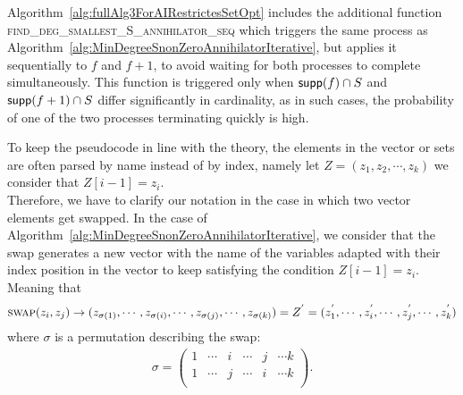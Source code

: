 \documentclass[11pt]{llncs}
\begin{document}
Algorithm~\ref{alg:fullAlg3ForAIRestrictesSetOpt} includes the additional function \textsc{find\_deg\_smallest\_S\_annihilator\_seq} which triggers the same process as Algorithm~\ref{alg:MinDegreeSnonZeroAnnihilatorIterative}, but applies it sequentially to $f$ and $f + 1$, to avoid waiting for both processes to complete simultaneously. This function is triggered only when $\mathsf{supp}(f) \cap S$ and $\mathsf{supp}(f + 1) \cap S$ differ significantly in cardinality, as in such cases, the probability of one of the two processes terminating quickly is high.

\begin{remark}\label{rem:permutationClarification}
    To keep the pseudocode in line with the theory, the elements in the vector or sets are often parsed by name instead of by index, namely let $Z = (z_1, z_2, \cdots, z_k)$ we consider that $Z[i-1] = z_i$.\\
    Therefore, we have to clarify our notation in the case in which two vector elements get swapped. In the case of Algorithm~\ref{alg:MinDegreeSnonZeroAnnihilatorIterative}, we consider that the swap generates a new vector with the name of the variables adapted with their index position in the vector to keep satisfying the condition $Z[i-1] = z_{i}$. Meaning that 
    \begin{align*}
        \mbox{\textsc{swap}}(z_i, z_j) \rightarrow (z_{\sigma(1)}, \cdots, z_{\sigma(i)}, \cdots, z_{\sigma(j)}, \cdots, z_{\sigma(k)}) = Z^{'} = (z^{'}_1, \cdots, z^{'}_i, \cdots, z^{'}_j, \cdots, z^{'}_k)
    \end{align*}
    where $\sigma$ is a permutation describing the swap:
    \begin{align*}
        \sigma = \begin{pmatrix}
            1 & \cdots & i & \cdots & j & \cdots k\\
            1 & \cdots & j & \cdots & i & \cdots k\\
        \end{pmatrix}.
    \end{align*}
\end{remark}



\end{document}
